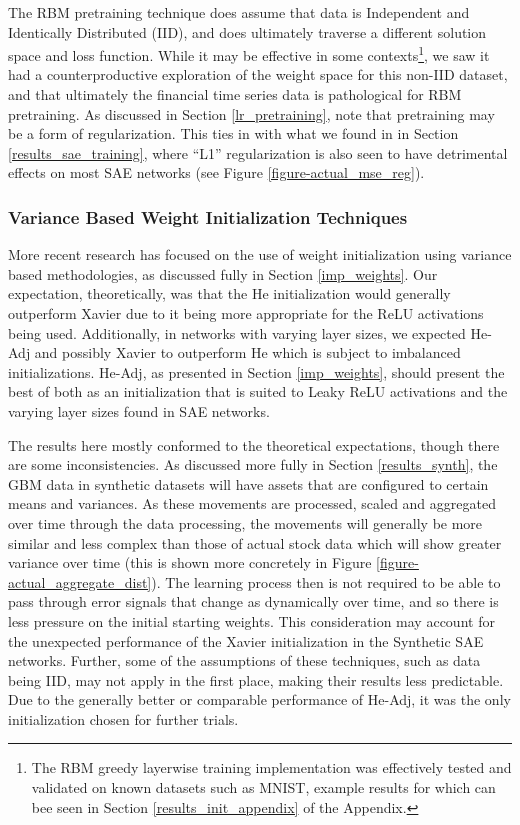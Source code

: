 \documentclass[a4paper,11pt,oneside]{article}
\theoremstyle{plain}
\theoremstyle{definition}
\begin{document}
	The RBM pretraining technique does assume that data is Independent and Identically Distributed (IID), and does ultimately traverse a different solution space and loss function. While it may be effective in some contexts\footnote{The RBM greedy layerwise training implementation was effectively tested and validated on known datasets such as MNIST, example results for which can bee seen in Section \ref{results_init_appendix} of the Appendix.}, we saw it had a counterproductive exploration of the weight space for this non-IID dataset, and that ultimately the financial time series data is pathological for RBM pretraining. As discussed in Section \ref{lr_pretraining}, \citet{Erhan} note that pretraining may be a form of regularization. This ties in with what we found in in Section \ref{results_sae_training}, where ``L1'' regularization is also seen to have detrimental effects on most SAE networks (see Figure \ref{figure-actual_mse_reg}).\newline
	
	\subsubsection{Variance Based Weight Initialization Techniques}
	
	More recent research has focused on the use of weight initialization using variance based methodologies, as discussed fully in Section \ref{imp_weights}. Our expectation, theoretically, was that the He initialization would generally outperform Xavier due to it being more appropriate for the ReLU activations being used. Additionally, in networks with varying layer sizes, we expected He-Adj and possibly Xavier to outperform He which is subject to imbalanced initializations. He-Adj, as presented in Section \ref{imp_weights}, should present the best of both as an initialization that is suited to Leaky ReLU activations and the varying layer sizes found in SAE networks.\newline
	
		The results here mostly conformed to the theoretical expectations, though there are some inconsistencies. As discussed more fully in Section \ref{results_synth}, the GBM data in synthetic datasets will have assets that are configured to certain means and variances. As these movements are processed, scaled and aggregated over time through the data processing, the movements will generally be more similar and less complex than those of actual stock data which will show greater variance over time (this is shown more concretely in Figure \ref{figure-actual_aggregate_dist}). The learning process then is not required to be able to pass through error signals that change as dynamically over time, and so there is less pressure on the initial starting weights. This consideration may account for the unexpected performance of the Xavier initialization in the Synthetic SAE networks. Further, some of the assumptions of these techniques, such as data being IID, may not apply in the first place, making their results less predictable.  Due to the generally better or comparable performance of He-Adj, it was the only initialization chosen for further trials.  \newline
	
\end{document}
